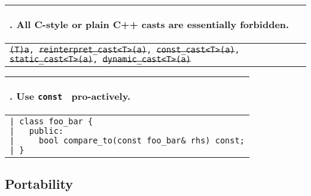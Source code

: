 \documentclass[10pt]{article}
\newcommand{\code}[1]{\color[rgb]{0.2,0.8,0.2}\texttt{#1}\color[rgb]{0,0,0} }
\newcounter {iCommandment}
\newcommand{\CorG}[5]
{
\begin{table}[H]
\begin{center}
\begin{tabular}{| p{12cm} |}
\hline
#1. #2 \\
\hline
\vspace{-0.1cm}
\parbox{12cm}{\code{#3}} \\
\vspace{-0.2cm}
#4 \\
#5 \\
\hline
\end{tabular}
\end{center}
\end{table}
}
\newcommand{\Commandment}[4]
{
\CorG{\textbf{\arabic{iCommandment}}\addtocounter{iCommandment}{1}}
{\textbf{#1}}{#2}{#3}{#4}
}
\begin{document}
\Commandment
{All C-style or plain C++ casts are essentially forbidden.}
{\sout{(T)a}, \sout{reinterpret\_cast<T>(a)}, \sout{const\_cast<T>(a)}, \sout{static\_cast<T>(a)}, \sout{dynamic\_cast<T>(a)}}
{
Both the C-style cast and the \code{reinterpret\_cast}\ have undefined behavior and are thus 
forbidden. The \code{const\_cast}\ operator can always be avoided, use the \code{mutable}\ qualifier on 
an exceptional data member that needs to change even within a const member function of a class.
The \code{static\_cast}\ operator is almost always avoidable by design, but it can be used to avoid 
warning messages like ``comparing signed and unsigned type''. For conversions, use the explicit conversion
operator, i.e. \code{T(a)}, instead of a static cast. For doing static casting of pointers, use the ReaK 
casting operator for the smart-pointers, that is, \code{ReaK::rtti::rk\_static\_ptr\_cast}. 
The \code{dynamic\_cast}\ operator must not be used in ReaK. First, dynamic casting is usually a sign
of bad design and is most often avoidable by design. If not avoidable and since ReaK should use smart-pointers
almost exclusively (especially for polymorphic classes, for which a dynamic cast could be required), a plain
C++ dynamic cast is not appropriate. Finally, ReaK uses its own RTTI system (Run-time Type Identification) 
and not that of C++, and thus, the \code{boost::dynamic\_pointer\_cast}\ operator is not appropriate either because it 
uses the C++ RTTI. So, for dynamic casting in ReaK, use the \code{ReaK::rtti::rk\_dynamic\_ptr\_cast}\ operator, 
which has the exact same effect as the Boost or plain C++ versions, but using ReaK's RTTI and smart-pointers.}
{\ }

\Commandment
{Use \code{const}\ pro-actively.}
{|\ class foo\_bar \{\\
|\ \ \ public:\\
|\ \ \ \ \ bool compare\_to(const foo\_bar\& rhs) const;\\
|\ \}
}
{The \code{const}\ qualifier is an integral part of the interfaces of functions and variable types. ReaK promotes 
a proactive use of this qualifier and since it has a infectious quality (thanks to the nice and strict type rules in C++), 
if you want to program in the ReaK library (or any other decent library), learn to program with const-correctness in mind.}
{\ }


\subsection{Portability}
\end{document}
